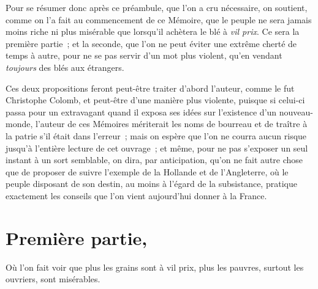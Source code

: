 \documentclass[french,twoside]{book} %
\begin{document}
Pour se résumer donc après ce préambule, que l’on a cru nécessaire, on soutient, comme on l’a fait au commencement de ce Mémoire, que le peuple ne sera jamais moins riche ni plus misérable que lorsqu’il achètera le blé à {\itshape vil prix}. Ce sera la première partie ; et la seconde, que l’on ne peut éviter une extrême cherté de temps à autre, pour ne se pas servir d’un mot plus violent, qu’en vendant {\itshape toujours} des blés aux étrangers.\par
Ces deux propositions feront peut-être traiter d’abord l’auteur, comme le fut Christophe Colomb, et peut-être d’une manière plus violente, puisque si celui-ci passa pour un extravagant quand il exposa ses idées sur l’existence d’un nouveau-monde, l’auteur de ces Mémoires mériterait les noms de bourreau et de traître à la patrie s’il était dans l’erreur ; mais on espère que l’on ne courra aucun risque jusqu’à l’entière lecture de cet ouvrage ; et même, pour ne pas s’exposer un seul instant à un sort semblable, on dira, par anticipation, qu’on ne fait autre chose que de proposer de suivre l’exemple de la Hollande et de l’Angleterre, où le peuple disposant de son destin, au moins à l’égard de la subsistance, pratique exactement les conseils que l’on vient aujourd’hui donner à la France.
\section[{Première partie,}]{Première partie,}
\noindent Où l’on fait voir que plus les grains sont à vil prix, plus les pauvres, surtout les ouvriers, sont misérables.\par
\end{document}
